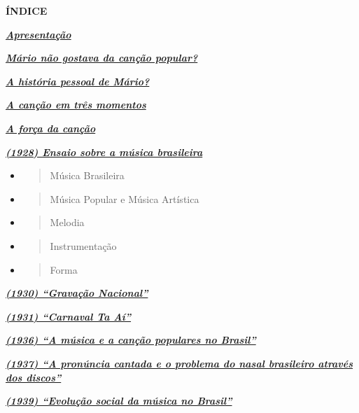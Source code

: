 \textbf{ÍNDICE}

\protect\hyperlink{690klblqu1e3}{\textbf{\emph{Apresentação}}}

\protect\hyperlink{jv7ss53k1ia9}{\textbf{\emph{Mário não gostava da
canção popular?}}}

\protect\hyperlink{9yj5i2vfw73m}{\textbf{\emph{A história pessoal de
Mário?}}}

\protect\hyperlink{d2iq4ce4l7oa}{\textbf{\emph{A canção em três
momentos}}}

\protect\hyperlink{ccpwfcdqmz14}{\textbf{\emph{A força da canção}}}

\protect\hyperlink{6cki8e4ocvdt}{\textbf{\emph{(1928) Ensaio sobre a
música brasileira}}}

\begin{itemize}
\item
  \begin{quote}
  Música Brasileira
  \end{quote}
\end{itemize}

\begin{itemize}
\item
  \begin{quote}
  Música Popular e Música Artística
  \end{quote}
\item
  \begin{quote}
  Melodia
  \end{quote}
\item
  \begin{quote}
  Instrumentação
  \end{quote}
\item
  \begin{quote}
  Forma
  \end{quote}
\end{itemize}

\protect\hyperlink{gr7qdblwnkw2}{\textbf{\emph{(1930) ``Gravação
Nacional''}}}

\protect\hyperlink{md1aioz2dy95}{\textbf{\emph{(1931) ``Carnaval Ta
Aí''}}}

\protect\hyperlink{sgjwyv12hyi8}{\textbf{\emph{(1936) ``A música e a
canção populares no Brasil''}}}

\protect\hyperlink{rrip1ldnfdzw}{\textbf{\emph{(1937) ``A pronúncia
cantada e o problema do nasal brasileiro através dos discos''}}}

\protect\hyperlink{y6pn2vx6zdf}{\textbf{\emph{(1939) ``Evolução social
da música no Brasil''}}}

